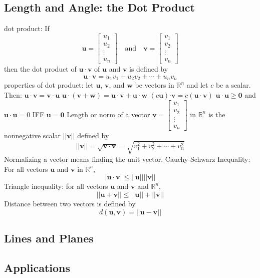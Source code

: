 \documentclass{article}
\begin{document}
    \subsection{Length and Angle: the Dot Product}
    \begin{outline}
        \1 dot product: If \[\mathbf u=\begin{bmatrix}u_1\\u_2\\\vdots\\u_n\end{bmatrix}\quad\text{and}\quad\mathbf v=\begin{bmatrix}v_1\\v_2\\\vdots\\v_n\end{bmatrix}\] then the dot product of \(\mathbf u\cdot\mathbf v\) of \(\mathbf u\) and \(\mathbf v\) is defined by \[\mathbf u\cdot\mathbf v=u_1v_1+u_2v_2+\cdots+u_nv_n\]
        \1 properties of dot product: let \(\mathbf u\), \(\mathbf v\), and \(\mathbf w\) be vectors in \(\mathbb R^n\) and let $c$ be a scalar. Then: 
            \2 \(\mathbf{u\cdot v}=\mathbf{v\cdot u}\)
            \2 \(\mathbf{u\cdot}(\mathbf{v+w})=\mathbf{u\cdot v+u\cdot w}\)
            \2 \((c\mathbf u)\mathbf{\cdot v}=c(\mathbf{u\cdot v})\)
            \2 \(\mathbf{u\cdot u\geq 0}\) and \(\mathbf{u\cdot u}=0\) IFF \(\mathbf u=\mathbf 0\)
            \2 Length or norm of a vector \(\mathbf v=\begin{bmatrix}v_1\\v_2\\\vdots\\v_n\end{bmatrix}\) in \(\mathbb R^n\) is the nonnegative scalar \(||\mathbf v||\) defined by \[||\mathbf v||=\sqrt{\mathbf{v\cdot v}}=\sqrt{v_1^2+v_2^2+\cdots+v_n^2}\]
        \1 Normalizing a vector means finding the unit vector. 
        \1 Cauchy-Schwarz Inequality: For all vectors \(\mathbf u\) and \(\mathbf v\) in \(\mathbb R^n\), \[|\mathbf{u\cdot v}|\leq ||\mathbf u||||\mathbf v||\]
        \1 Triangle inequality: for all vectors \(\mathbf u\) and \(\mathbf v\) and \(\mathbb R^n\), \[||\mathbf u+\mathbf v||\leq||\mathbf u||+||\mathbf v||\]
        \1 Distance between two vectors is defined by \[d(\mathbf u,\mathbf v)=||\mathbf u-\mathbf v||\]
        

    \end{outline}
    \subsection{Lines and Planes}
    \begin{outline}
        
    \end{outline}
    \subsection{Applications}
    \begin{outline}
        
    \end{outline}
\end{document}
